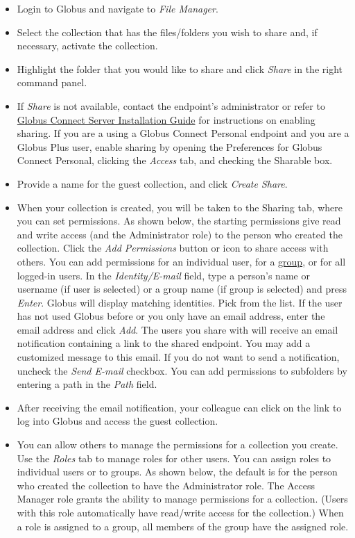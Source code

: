 \begin{itemize}
\item Login to Globus and navigate to \emph{File Manager}.
\item Select the collection that has the files/folders you wish to share and, 
if necessary, activate the collection.
\item Highlight the folder that you would like to share and click \emph{Share} 
in the right command panel.
\item If \emph{Share} is not available, contact the endpoint's administrator or refer to 
\href{https://docs.globus.org/globus-connect-server-installation-guide/}{Globus Connect Server Installation Guide} 
for instructions on enabling sharing. If you are a using a \gls{Globus Connect} 
Personal endpoint and you are a Globus Plus user, enable sharing by opening the 
Preferences for \gls{Globus Connect} Personal, clicking the \emph{Access} tab, 
and checking the Sharable box.
\item Provide a name for the guest collection, and click \emph{Create Share}.
\item When your collection is created, you will be taken to the Sharing tab, 
where you can set permissions. As shown below, the starting permissions give 
read and write access (and the Administrator role) to the person who created 
the collection.
Click the \emph{Add Permissions} button or icon to share access with others. 
You can add permissions for an individual user, 
for a \href{https://docs.globus.org/how-to/managing-groups/}{group}, 
or for all logged-in users. In the \emph{Identity/E-mail} field, 
type a person's name or username (if user is selected) or a group name 
(if group is selected) and press \emph{Enter}. Globus will display matching identities. 
Pick from the list. If the user has not used Globus before or you only have an email 
address, enter the email address and click \emph{Add}.
The users you share with will receive an email notification containing a link to the 
shared endpoint. You may add a customized message to this email. If you do not want 
to send a notification, uncheck the \emph{Send E-mail} checkbox.
You can add permissions to subfolders by entering a path in the \emph{Path} field.
\item After receiving the email notification, your colleague can click on the link 
to log into Globus and access the guest collection.
\item You can allow others to manage the permissions for a collection you create. 
Use the \emph{Roles} tab to manage roles for other users. You can assign roles to 
individual users or to groups. As shown below, the default is for the person who 
created the collection to have the Administrator role.
The Access Manager role grants the ability to manage permissions for a collection. 
(Users with this role automatically have read/write access for the collection.)
When a role is assigned to a group, all members of the group have the assigned role.
\end{itemize}

